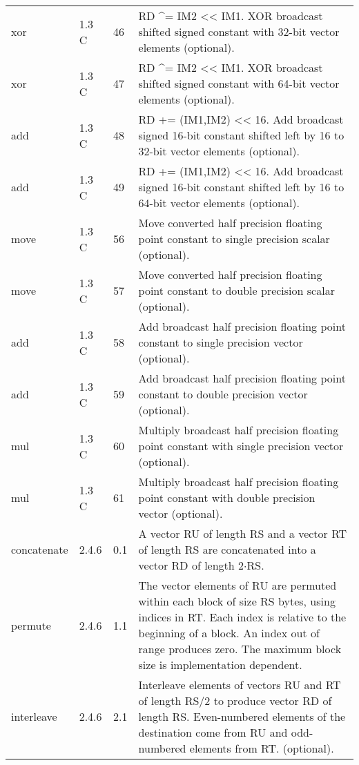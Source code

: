 \documentclass[forwardcom.tex]{subfiles}
\begin{document}
\begin{longtable} {|p{20mm}|p{10mm}|p{8mm}|p{75mm}|}
xor           & 1.3 C & 46 & RD \^{}= IM2 \textless\textless{} IM1. XOR broadcast shifted signed constant with 32-bit vector elements (optional). \\
xor           & 1.3 C & 47 & RD \^{}= IM2 \textless\textless{} IM1. XOR broadcast shifted signed constant with 64-bit vector elements (optional). \\
add           & 1.3 C & 48 & RD += (IM1,IM2) \textless\textless{} 16. Add broadcast signed 16-bit constant shifted left by 16 to 32-bit vector elements (optional). \\
add           & 1.3 C & 49 & RD += (IM1,IM2) \textless\textless{} 16. Add broadcast signed 16-bit constant shifted left by 16 to 64-bit vector elements (optional). \\
move          & 1.3 C & 56 & Move converted half precision floating point constant to single
precision scalar (optional). \\
move          & 1.3 C & 57 & Move converted half precision floating point constant to double
precision scalar (optional). \\
add           & 1.3 C & 58 & Add broadcast half precision floating point constant to single
precision vector (optional). \\
add           & 1.3 C & 59 & Add broadcast half precision floating point constant to double
precision vector (optional). \\
mul           & 1.3 C & 60 & Multiply broadcast half precision floating point constant with single precision vector (optional). \\
mul           & 1.3 C & 61 & Multiply broadcast half precision floating point constant with double precision vector (optional). \\

concatenate   & 2.4.6 & 0.1 & A vector RU of length RS and a vector RT of length RS are
concatenated into a vector RD of length 2$\cdot$RS. \\

permute       & 2.4.6 & 1.1 & The vector elements of RU are permuted within each block of size RS bytes, using indices in RT. Each index is relative to the
beginning of a block. An index out of range produces zero. The
maximum block size is implementation dependent. \\

interleave    & 2.4.6 & 2.1 & Interleave elements of vectors RU and RT of length RS/2 to produce vector RD of length RS. Even-numbered elements of the destination come from RU and odd-numbered elements from RT. (optional). \\


\end{longtable}
\end{document}

